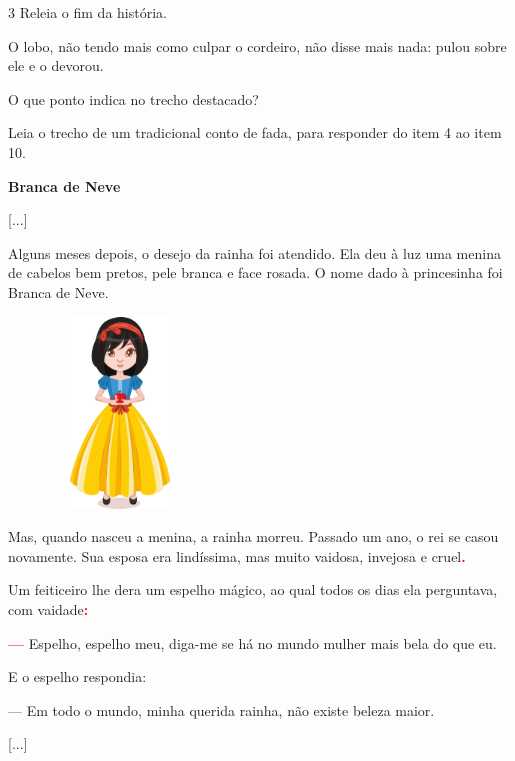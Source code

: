 \pagebreak
\num{3} Releia o fim da história.

\begin{myquote}
O lobo, não tendo mais como culpar o cordeiro, não disse mais nada:
pulou sobre ele e o devorou.
\end{myquote}

O que ponto indica no trecho destacado? 

\num{} Leia o trecho de um tradicional conto de fada, para responder 
do item 4 ao item 10. 



\enlargethispage{3\baselineskip}
\begin{myquote}
\textbf{Branca de Neve}

{[}...{]}

Alguns meses depois, o desejo da rainha foi atendido. Ela deu à luz uma
menina de cabelos bem pretos, pele branca e face rosada. O nome dado à
princesinha foi Branca de Neve.

\begin{figure}
\includegraphics[width=1.5in,height=2in]{./media/image6.png}
\end{figure}

Mas, quando nasceu a menina, a rainha morreu. Passado um ano, o rei se
casou novamente. Sua esposa era lindíssima, mas muito vaidosa, invejosa
e cruel\textcolor{red}{\textbf{.}}

Um feiticeiro lhe dera um espelho mágico, ao qual todos os dias ela
perguntava, com vaidade\textcolor{red}{\textbf{:}}

\textcolor{red}{\textbf{---}} Espelho, espelho meu, diga-me se há no mundo mulher mais bela do que
eu.

E o espelho respondia:

--- Em todo o mundo, minha querida rainha, não existe beleza maior.

{[}...{]}

\end{myquote}
\pagebreak

